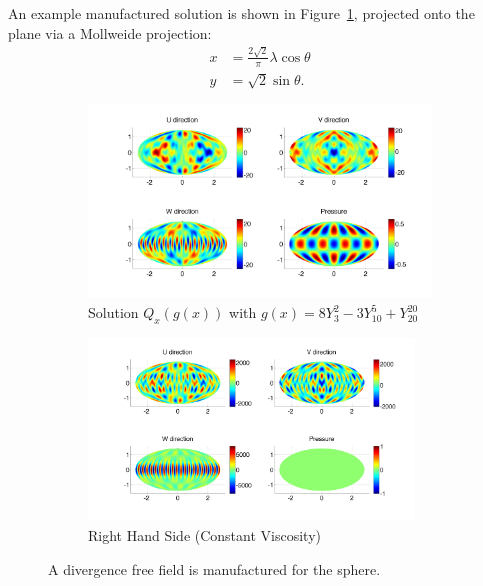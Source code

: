 An example manufactured solution is shown in Figure~\ref{fig:manufactured_solution}, projected onto the plane via a Mollweide projection: 
\begin{align*}
x &= \frac{2\sqrt{2}}{\pi} \lambda \cos{\theta} \\
y &= \sqrt{2}\sin{\theta}.
\end{align*}

\begin{figure} 
\centering
\begin{subfigure}[b]{\textwidth}
\centering
\includegraphics[width=1.0\textwidth]{../figures/paper2/figures/U_exact.png}
\caption{Solution $Q_x( g(x) )$ with $g(x) = 8 Y_{3}^{2} - 3Y_{10}^{5} + Y_{20}^{20}$}
\end{subfigure}
\begin{subfigure}[b]{\textwidth}
\centering
\includegraphics[width=0.95\textwidth]{../figures/paper2/figures/RHS.png}
\caption{Right Hand Side (Constant Viscosity)}
\end{subfigure}
\caption{A divergence free field is manufactured for the sphere. }
\label{fig:manufactured_solution}
\end{figure} 


